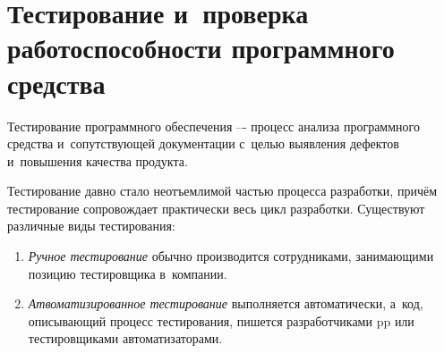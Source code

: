 \section{Тестирование и~проверка работоспособности программного средства}
\label{sec:testing}

Тестирование программного обеспечения –- процесс анализа программного средства и~сопутствующей документации с~целью выявления дефектов и~повышения качества продукта\cite{kulikov_testing}.

Тестирование давно стало неотъемлимой частью процесса разработки, причём тестирование сопровождает практически весь цикл разработки. Существуют различные виды тестирования:
\begin{enumerate}
	\item \textit{Ручное тестирование} обычно производится сотрудниками, занимающими позицию тестировщика в~компании.
	\item \textit{Атвоматизированное тестирование} выполняется автоматически, а~код, описывающий процесс тестирования, пишется разработчиками \gls{pp} или тестировщиками автоматизаторами.
\end{enumerate}